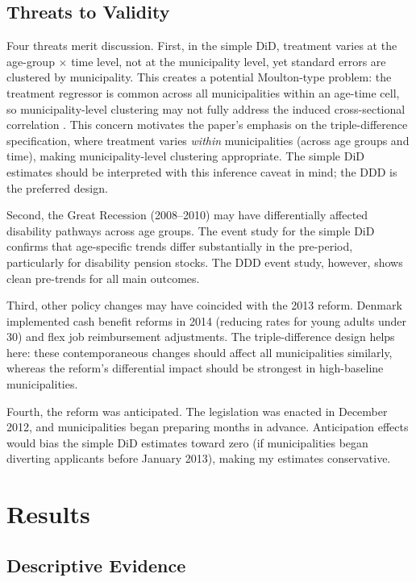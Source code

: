 \documentclass[12pt]{article}
\begin{document}
\subsection{Threats to Validity}

Four threats merit discussion. First, in the simple DiD, treatment varies at the age-group $\times$ time level, not at the municipality level, yet standard errors are clustered by municipality. This creates a potential Moulton-type problem: the treatment regressor is common across all municipalities within an age-time cell, so municipality-level clustering may not fully address the induced cross-sectional correlation \citep{bertrand2004much}. This concern motivates the paper's emphasis on the triple-difference specification, where treatment varies \textit{within} municipalities (across age groups and time), making municipality-level clustering appropriate. The simple DiD estimates should be interpreted with this inference caveat in mind; the DDD is the preferred design.

Second, the Great Recession (2008--2010) may have differentially affected disability pathways across age groups. The event study for the simple DiD confirms that age-specific trends differ substantially in the pre-period, particularly for disability pension stocks. The DDD event study, however, shows clean pre-trends for all main outcomes.

Third, other policy changes may have coincided with the 2013 reform. Denmark implemented cash benefit reforms in 2014 (reducing rates for young adults under 30) and flex job reimbursement adjustments. The triple-difference design helps here: these contemporaneous changes should affect all municipalities similarly, whereas the reform's differential impact should be strongest in high-baseline municipalities.

Fourth, the reform was anticipated. The legislation was enacted in December 2012, and municipalities began preparing months in advance. Anticipation effects would bias the simple DiD estimates toward zero (if municipalities began diverting applicants before January 2013), making my estimates conservative.


\section{Results}
\label{sec:results}

\subsection{Descriptive Evidence}
\end{document}
